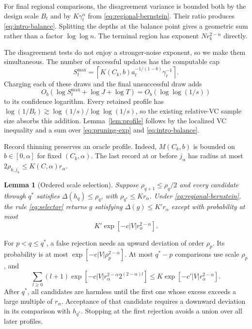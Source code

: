 \documentclass[twoside]{article}
\newtheorem{lemma}[theorem]{Lemma}
\newcommand{\Ex}{\Delta}
\begin{document}
For final regional comparisons, the disagreement variance is bounded both by the design scale $B_t$ and by $K\gamma_t^\alpha$ from \eqref{eq:regional-bernstein}. Their ratio produces \eqref{eq:intro-balance}. Splitting the depths at the balance point gives a geometric sum rather than a factor $\log\log n$. The terminal region has exponent $Nr_b^{2-\alpha}$ directly.

The disagreement tests do not enjoy a stronger-noise exponent, so we make them simultaneous. The number of successful updates has the computable cap \[ S_t^{\max}=\left\lceil K(C_k,b)a_t^{-1/(1-b)}\gamma_t^{-1} \right\rceil. \] Charging each of these draws and the final unsuccessful draw adds \[ O_b(\log S_t^{\max}+\log J+\log T) =O_b(\log\log(1/s)) \] to its confidence logarithm. Every retained profile has $\log(1/B_t)\gtrsim\log(1/s)/\log\log(1/s)$, so the existing relative-VC sample size absorbs this addition. Lemma~\ref{lem:profile} follows by the localized VC inequality and a sum over \eqref{eq:pruning-exp} and \eqref{eq:intro-balance}.

Record thinning preserves an oracle profile. Indeed, $M(C_k,b)$ is bounded on $b\in[0,\alpha]$ for fixed $(C_k,\alpha)$. The last record at or before $j_\alpha$ has radius at most $2\rho_{k,j_\alpha}\leq K(C,\alpha)r_\alpha$.

\begin{lemma}[Ordered scale selection]
\label{lem:selector}
Suppose $\rho_{q+1}\leq\rho_q/2$ and every candidate through $q^*$ satisfies $\Ex(h_q)\leq\rho_q$, with $\rho_{q^*}\leq Kr_\alpha$. Under \eqref{eq:regional-bernstein}, the rule \eqref{eq:selector} returns $g$ satisfying $\Ex(g)\leq K'r_\alpha$ except with probability at most \[ K'\exp[-c|V|r_\alpha^{2-\alpha}]. \]
\end{lemma}

For $p<q\leq q^*$, a false rejection needs an upward deviation of order $\rho_p$. Its probability is at most $\exp[-c|V|\rho_p^{2-\alpha}]$. At most $q^*-p$ comparisons use scale $\rho_p$, and
\begin{equation}
 \sum_{l\geq0}(l+1)
 \exp[-c|V|r_\alpha^{2-\alpha}2^{(2-\alpha)l}]
 \leq K\exp[-c'|V|r_\alpha^{2-\alpha}].
 \label{eq:selector-sum}
\end{equation}
After $q^*$, all candidates are harmless until the first one whose excess exceeds a large multiple of $r_\alpha$. Acceptance of that candidate requires a downward deviation in its comparison with $h_{q^*}$. Stopping at the first rejection avoids a union over all later profiles.
\end{document}
